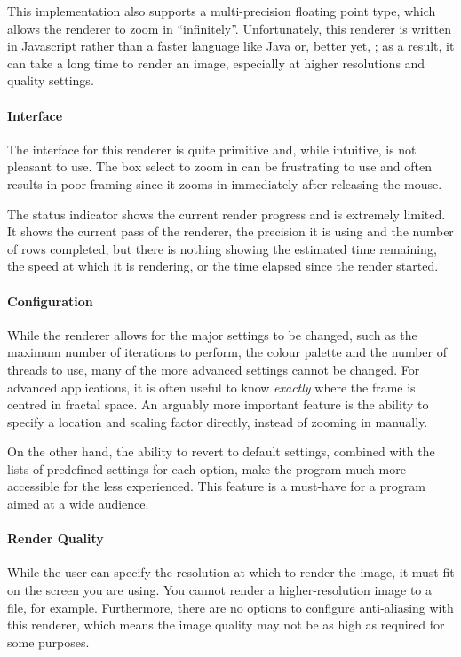This implementation also supports a multi-precision floating point type, which allows the renderer to zoom in ``infinitely''. Unfortunately, this renderer is written in Javascript rather than a faster language like Java or, better yet, \CPP; as a result, it can take a long time to render an image, especially at higher resolutions and quality settings.

\vspace{0.25cm}

\paragraph{Interface} The interface for this renderer is quite primitive and, while intuitive, is not pleasant to use. The box select to zoom in can be frustrating to use and often results in poor framing since it zooms in immediately after releasing the mouse.

The status indicator shows the current render progress and is extremely limited. It shows the current pass of the renderer, the precision it is using and the number of rows completed, but there is nothing showing the estimated time remaining, the speed at which it is rendering, or the time elapsed since the render started.

\paragraph{Configuration} While the renderer allows for the major settings to be changed, such as the maximum number of iterations to perform, the colour palette and the number of threads to use, many of the more advanced settings cannot be changed. For advanced applications, it is often useful to know \textit{exactly} where the frame is centred in fractal space. An arguably more important feature is the ability to specify a location and scaling factor directly, instead of zooming in manually.

On the other hand, the ability to revert to default settings, combined with the lists of predefined settings for each option, make the program much more accessible for the less experienced. This feature is a must-have for a program aimed at a wide audience.

\paragraph{Render Quality} While the user can specify the resolution at which to render the image, it must fit on the screen you are using. You cannot render a higher-resolution image to a file, for example. Furthermore, there are no options to configure anti-aliasing with this renderer, which means the image quality may not be as high as required for some purposes.

